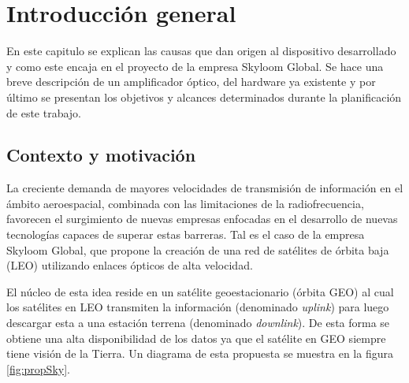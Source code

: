 
\chapter{Introducción general} %

\label{Chapter1} %
\label{IntroGeneral}


\newcommand{\keyword}[1]{\textbf{#1}}
\newcommand{\tabhead}[1]{\textbf{#1}}
\newcommand{\code}[1]{\texttt{#1}}
\newcommand{\file}[1]{\texttt{\bfseries#1}}
\newcommand{\option}[1]{\texttt{\itshape#1}}
\newcommand{\grados}{$^{\circ}$}


En este capitulo se explican las causas que dan origen al dispositivo desarrollado y como este encaja en el proyecto de la empresa Skyloom Global. Se hace una breve descripción de un amplificador óptico, del hardware ya existente y por último se presentan los objetivos y alcances determinados durante la planificación de este trabajo.


\section{Contexto y motivación}

La creciente demanda de mayores velocidades de transmisión de información en el ámbito aeroespacial, combinada con las limitaciones de la radiofrecuencia, favorecen el surgimiento de nuevas empresas enfocadas en el desarrollo de nuevas tecnologías capaces de superar estas barreras. Tal es el caso de la empresa Skyloom Global, que propone la creación de una red de satélites de órbita baja (LEO) utilizando enlaces ópticos de alta velocidad.

El núcleo de esta idea reside en un satélite geoestacionario (órbita GEO) al cual los satélites en LEO transmiten la información (denominado \textit{uplink}) para luego descargar esta a una estación terrena (denominado \textit{downlink}). De esta forma se obtiene una alta disponibilidad de los datos ya que el satélite en GEO siempre tiene visión de la Tierra. Un diagrama de esta propuesta se muestra en la figura \ref{fig:propSky}.


